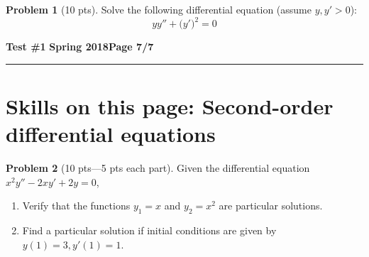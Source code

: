 \documentclass[12pt]{article}
\theoremstyle{definition}
\newtheorem{problem}{Problem}
\begin{document}
\begin{problem}[10 pts]
Solve the following differential equation (assume $y,y'>0$):
\begin{equation*}
y y'' + \big(y'\big)^2=0
\end{equation*}


\vspace{7cm}
\begin{flushright}
\end{flushright}
\end{problem}

\newpage

\hfill{\large\bf Test \#1}\hfill{\large\bf
Spring 2018}\hfill{\large\bf Page 7/7}\hrule

\section*{Skills on this page: Second-order differential equations}

\begin{problem}[10 pts---5 pts each part]
Given the differential equation $x^2y''-2xy'+2y=0$,
\begin{enumerate}
  \item Verify that the functions $y_1=x$ and $y_2=x^2$ are particular solutions.
  \item Find a particular solution if initial conditions are given by $y(1)=3, y'(1)=1$.

\end{enumerate}
\end{problem}
\end{document}
